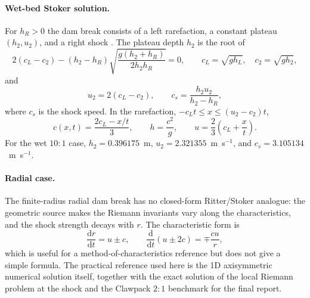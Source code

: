 ﻿\documentclass[11pt,a4paper]{article}
\begin{document}
\paragraph{Wet-bed Stoker solution.}
For $h_R>0$ the dam break consists of a left rarefaction, a constant plateau
$(h_2,u_2)$, and a right shock \cite{stoker1957}.  The plateau depth $h_2$ is
the root of
\begin{equation}
  2(c_L-c_2) - (h_2-h_R)\sqrt{\frac{g(h_2+h_R)}{2h_2h_R}}=0,
  \qquad c_L=\sqrt{g h_L},\quad c_2=\sqrt{g h_2},
  \label{eq:stoker_h2}
\end{equation}
and
\begin{equation}
  u_2=2(c_L-c_2),\qquad c_s=\frac{h_2u_2}{h_2-h_R},
  \label{eq:stoker_u}
\end{equation}
where $c_s$ is the shock speed.  In the rarefaction,
$-c_L t\le x\le (u_2-c_2)t$,
\begin{equation}
  c(x,t)=\frac{2c_L-x/t}{3},\qquad
  h=\frac{c^2}{g},\qquad
  u=\frac{2}{3}\left(c_L+\frac{x}{t}\right).
  \label{eq:stoker_fan}
\end{equation}
For the wet $10:1$ case, $h_2=0.396175$~m, $u_2=2.321355$~m~s$^{-1}$, and
$c_s=3.105134$~m~s$^{-1}$.

\paragraph{Radial case.}
The finite-radius radial dam break has no closed-form Ritter/Stoker analogue:
the geometric source makes the Riemann invariants vary along the
characteristics, and the shock strength decays with $r$.  The characteristic
form is
\begin{equation}
  \frac{\mathrm{d}r}{\mathrm{d}t}=u\pm c,\qquad
  \frac{\mathrm{d}}{\mathrm{d}t}(u\pm 2c)=\mp\frac{c u}{r},
  \label{eq:radchar}
\end{equation}
which is useful for a method-of-characteristics reference but does not give a
simple formula.  The practical reference used here is the 1D axisymmetric
numerical solution itself, together with the exact solution of the local
Riemann problem at the shock and the Clawpack $2:1$ benchmark
\cite{mandli2016} for the final report.
\end{document}
